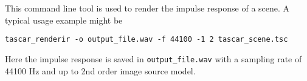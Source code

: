 This command line tool is used to render the impulse response of a \tascar{} scene. A typical usage example might be

\begin{lstlisting}[numbers=none]
  tascar_renderir -o output_file.wav -f 44100 -1 2 tascar_scene.tsc
\end{lstlisting}

Here the impulse response is saved in \verb!output_file.wav! with a sampling rate of 44100 Hz and up to 2nd order image source model.

